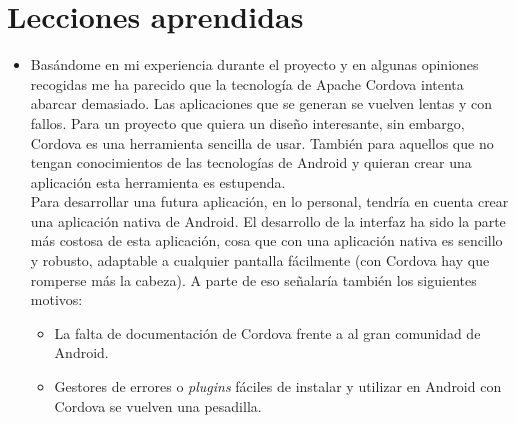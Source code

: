 \section{Lecciones aprendidas}

\begin{itemize}
\item Basándome en mi experiencia durante el proyecto y en algunas opiniones recogidas me ha parecido que la tecnología de Apache Cordova intenta abarcar demasiado. Las aplicaciones que se generan se vuelven lentas y con fallos. Para un proyecto que quiera un diseño interesante, sin embargo, Cordova es una herramienta sencilla de usar. También para aquellos que no tengan conocimientos de las tecnologías de Android y quieran crear una aplicación esta herramienta es estupenda.\\

Para desarrollar una futura aplicación, en lo personal, tendría en cuenta crear una aplicación nativa de Android. El desarrollo de la interfaz ha sido la parte más costosa de esta aplicación, cosa que con una aplicación nativa es sencillo y robusto, adaptable a cualquier pantalla fácilmente (con Cordova hay que romperse más la cabeza). A parte de eso señalaría también los siguientes motivos:
\begin{itemize}
\item La falta de documentación de Cordova frente a al gran comunidad de Android.
\item Gestores de errores o \textit{plugins} fáciles de instalar y utilizar en Android con Cordova se vuelven una pesadilla.
\end{itemize}
\end{itemize}